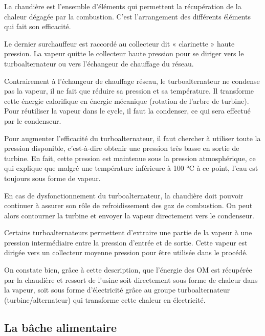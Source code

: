 La chaudière est l’ensemble d’éléments qui permettent la récupération de la chaleur dégagée par la combustion. C’est l’arrangement des différents éléments qui fait son efficacité.
\vspace{0.3cm}

Le dernier surchauffeur est raccordé au collecteur dit « clarinette » haute pression.
La vapeur quitte le collecteur haute pression pour se diriger vers le turboalternateur ou vers l’échangeur de chauffage du réseau.
\vspace{0.3cm}

Contrairement à l’échangeur de chauffage réseau, le turboalternateur ne condense pas la vapeur, il ne fait que réduire sa pression et sa température. Il transforme cette énergie calorifique en énergie mécanique (rotation de l’arbre de turbine). Pour réutiliser la vapeur dans le cycle, il faut la condenser, ce qui sera effectué par le condenseur.
\vspace{0.3cm}

Pour augmenter l’efficacité du turboalternateur, il faut chercher à utiliser toute la pression disponible, c’est-à-dire obtenir une pression très basse en sortie de turbine. En fait, cette pression est maintenue sous la pression atmosphérique, ce qui explique que malgré une température inférieure à 100 °C à ce point, l’eau est toujours sous forme de vapeur.
\vspace{0.3cm}

En cas de dysfonctionnement du turboalternateur, la chaudière doit pouvoir continuer à assurer son rôle de refroidissement des gaz de combustion. On peut alors contourner la turbine et envoyer la vapeur directement vers le condenseur.
\vspace{0.3cm}

Certains turboalternateurs permettent d’extraire une partie de la vapeur à une pression intermédiaire entre la pression d’entrée et de sortie. Cette vapeur est dirigée vers un collecteur moyenne pression pour être utilisée dans le procédé.
\vspace{0.3cm}

On constate bien, grâce à cette description, que l’énergie des OM est récupérée par la chaudière et ressort de l’usine soit directement sous forme de chaleur dans la vapeur, soit sous forme d’électricité grâce au groupe turboalternateur (turbine/alternateur) qui transforme cette chaleur en électricité.

 
\subsection{La bâche alimentaire}


